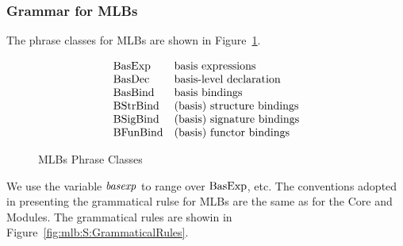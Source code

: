 \subsubsection{Grammar for MLBs}
The phrase classes for MLBs are shown in
Figure~\ref{fig:mlb:S:PhraseClasses}.
\begin{figure}[h]
\begin{displaymath}
\begin{array}{ll}
\mrm{BasExp} & \mbox{basis expressions} \\
\mrm{BasDec} & \mbox{basis-level declaration} \\
\mrm{BasBind} & \mbox{basis bindings} \\
\mrm{BStrBind} & \mbox{(basis) structure bindings} \\
\mrm{BSigBind} & \mbox{(basis) signature bindings} \\
\mrm{BFunBind} & \mbox{(basis) functor bindings}
\end{array}
\end{displaymath}
\caption{MLBs Phrase Classes}\label{fig:mlb:S:PhraseClasses}
\end{figure}
We use the variable $\mit{basexp}$ to range over $\mrm{BasExp}$, etc.
The conventions adopted in presenting the grammatical rulse for MLBs
are the same as for the Core and Modules.  The grammatical rules are
showin in Figure~\ref{fig:mlb:S:GrammaticalRules}.
